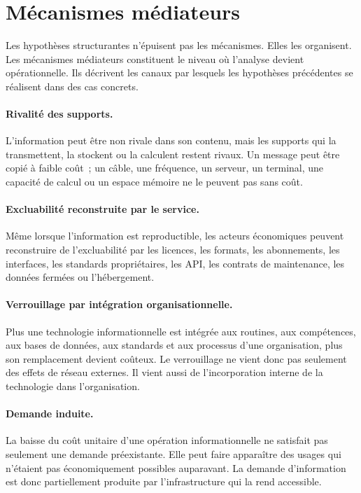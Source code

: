 \section{Mécanismes médiateurs}

Les hypothèses structurantes n'épuisent pas les mécanismes. Elles les organisent. Les mécanismes médiateurs constituent le niveau où l'analyse devient opérationnelle. Ils décrivent les canaux par lesquels les hypothèses précédentes se réalisent dans des cas concrets.

\paragraph{Rivalité des supports.}
L'information peut être non rivale dans son contenu, mais les supports qui la transmettent, la stockent ou la calculent restent rivaux. Un message peut être copié à faible coût~; un câble, une fréquence, un serveur, un terminal, une capacité de calcul ou un espace mémoire ne le peuvent pas sans coût.

\paragraph{Excluabilité reconstruite par le service.}
Même lorsque l'information est reproductible, les acteurs économiques peuvent reconstruire de l'excluabilité par les licences, les formats, les abonnements, les interfaces, les standards propriétaires, les API, les contrats de maintenance, les données fermées ou l'hébergement.

\paragraph{Verrouillage par intégration organisationnelle.}
Plus une technologie informationnelle est intégrée aux routines, aux compétences, aux bases de données, aux standards et aux processus d'une organisation, plus son remplacement devient coûteux. Le verrouillage ne vient donc pas seulement des effets de réseau externes. Il vient aussi de l'incorporation interne de la technologie dans l'organisation.

\paragraph{Demande induite.}
La baisse du coût unitaire d'une opération informationnelle ne satisfait pas seulement une demande préexistante. Elle peut faire apparaître des usages qui n'étaient pas économiquement possibles auparavant. La demande d'information est donc partiellement produite par l'infrastructure qui la rend accessible.

